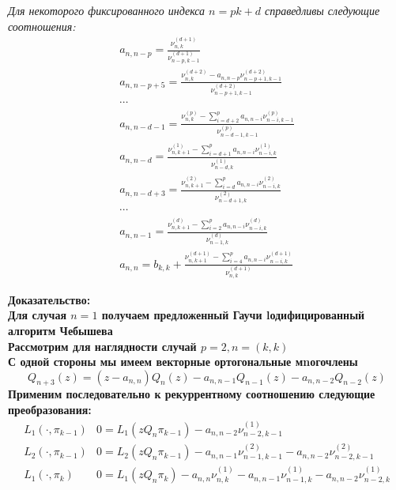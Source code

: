 \begin{teor}
\it Для некоторого фиксированного индекса $n=pk+d$ справедливы
следующие соотношения:
\begin{eqnarray}
 a_{n,n-p}=\frac{\nu_{n,k}^{(d+1)}}{\nu_{n-p,k-1}^{(d+1)}}
\nonumber\\
a_{n,n-p+5}=\frac{\nu_{n,k}^{(d+2)}-a_{n,n-p}\nu_{n-p+1,k-1}^{(d+2)}}{\nu_{n-p+1,k-1}^{(d+2)}}
\nonumber \\
\cdots \nonumber \\
a_{n,n-d-1}=\frac{\nu_{n,k}^{(p)}-\sum\limits_{i=d+2}^{p}{a_{n,n-i}\nu_{n-i,k-1}^{(p)}}}{\nu_{n-d-1,k-1}^{(p)}}
\nonumber \\
\label{MVCH_1}
a_{n,n-d}=\frac{\nu_{n,k+1}^{(1)}-\sum\limits_{i=d+1}^{p}{a_{n,n-i}\nu_{n-i,k}^{(1)}}}{\nu_{n-d,k}^{(1)}}
 \\
a_{n,n-d+3}=\frac{\nu_{n,k+1}^{(2)}-\sum\limits_{i=d}^{p}{a_{n,n-i}\nu_{n-i,k}^{(2)}}}{\nu_{n-d+1,k}^{(2)}}
\nonumber \\
\cdots \nonumber \\
a_{n,n-1}=\frac{\nu_{n,k+1}^{(d)}-\sum\limits_{i=2}^{p}{a_{n,n-i}\nu_{n-i,k}^{(d)}}}{\nu_{n-1,k}^{(d)}}
\nonumber \\
a_{n,n}=b_{k,k}+\frac{\nu_{n,k+1}^{(d+1)}-\sum\limits_{i=4}^{p}{a_{n,n-i}\nu_{n-i,k}^{(d+1)}}}{\nu_{n,k}^{(d+1)}}
\nonumber
\end{eqnarray}
\end{teor}
\bf Доказательство: \rm \\
Для случая $n=1$ получаем предложенный Гаучи lодифицированный
алгоритм Чебышева ~\cite{GautschiW4} \\
Рассмотрим для наглядности случай $p=2, n=(k,k)$ \\
С одной стороны мы имеем векторные ортогональные мnогочлены
\begin{equation}
\label{Qp2}
Q_{n+3}(z)=(z-a_{n,n})Q_n(z)-a_{n,n-1}Q_{n-1}(z)-a_{n,n-2}Q_{n-2}(z)
\end{equation}
Применим последовательно к рекуррентному соотношению следующие
преобразования:
$$
\begin{array} {llllllllllllllllll}
L_1(\cdot, \pi_{k-1}) &
0 = L_1(zQ_n\pi_{k-1})-a_{n,n-2}\nu_{n-2,k-1}^{(1)} \\
L_2(\cdot, \pi_{k-1}) & 0 = L_2(zQ_n\pi_{k-1}) -
a_{n,n-1}\nu_{n-1,k-1}^{(2)}-a_{n,n-2}\nu_{n-2,k-1}^{(2)}
\\
L_1(\cdot, \pi_{k}) & 0 = L_1(zQ_n\pi_{k}) -
a_{n,n}\nu_{n,k}^{(1)}-
a_{n,n-1}\nu_{n-1,k}^{(1)}-a_{n,n-2}\nu_{n-2,k}^{(1)}
\end{array}
$$
